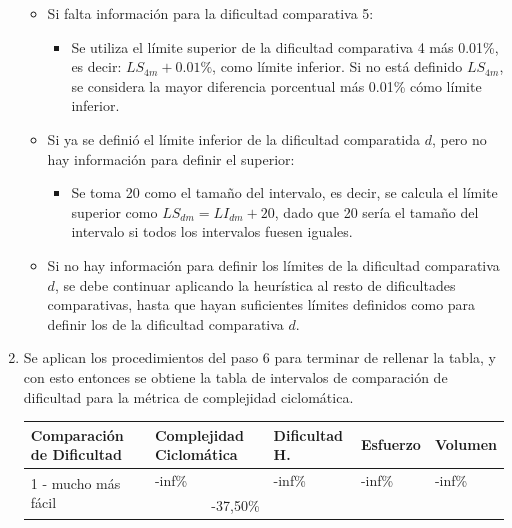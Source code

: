 \documentclass[letterpaper,12pt]{article}
\begin{document}
\begin{enumerate}
\begin{itemize}
\begin{itemize}
                \end{itemize}
          \item Si falta información para la dificultad comparativa 5:
                \begin{itemize}
                  \item Se utiliza el límite superior de la dificultad comparativa 4 más 0.01\%, es decir: $LS_{4m} + 0.01\%$, como límite inferior. Si no está definido $LS_{4m}$, se considera la mayor diferencia porcentual más 0.01\% cómo límite inferior.
                \end{itemize}
          \item Si ya se definió el límite inferior de la dificultad comparatida $d$, pero no hay información para definir el superior:
                \begin{itemize}
                  \item Se toma 20 como el tamaño del intervalo, es decir, se calcula el límite superior como $LS_{dm} = LI_{dm} + 20$, dado que 20 sería el tamaño del intervalo si todos los intervalos fuesen iguales.
                \end{itemize}
          \item Si no hay información para definir los límites de la dificultad comparativa $d$, se debe continuar aplicando la heurística al resto de dificultades comparativas, hasta que hayan suficientes límites definidos como para definir los de la dificultad comparativa $d$.
        \end{itemize}
  \item Se aplican los procedimientos del paso 6 para terminar de rellenar la tabla, y con esto entonces se obtiene la tabla de intervalos de comparación de dificultad para la métrica de complejidad ciclomática.
        \begin{table}[H]
          \centering
          \begin{tabular}{|l|r|l|l|l|}
            \hline
            \textbf{Comparación de Dificultad}     & \multicolumn{1}{l|}{\textbf{Complejidad Ciclomática}} & \textbf{Dificultad H.} & \textbf{Esfuerzo} & \textbf{Volumen} \\ \hline
            \multirow{2}{*}{1 - mucho más fácil}   & \multicolumn{1}{l|}{-inf\%}                           & -inf\%                 & -inf\%            & -inf\%           \\ \cline{2-5}
                                                   & -37,50\%                                              &                        &                   &                  \\ \hline

\end{tabular}
\end{table}
\end{enumerate}
\end{document}

